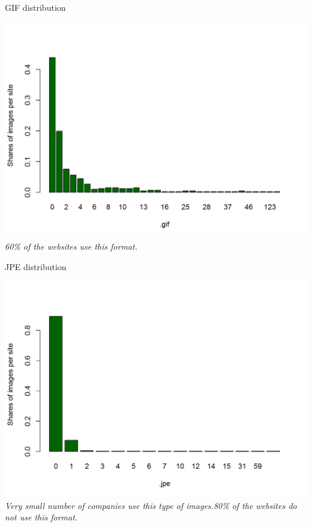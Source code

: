 \documentclass{book}
\begin{document}
\begin{table}[H]
\centering
\caption{GIF distribution}
\begin{center}
\includegraphics[scale=0.4]{../R/photos/56_gif_dist.png}    \\
\textit{60\% of the websites use this format.}
\end{center}
\end{table}
\begin{table}[H]
\centering
\caption{JPE distribution}
\begin{center}
\includegraphics[scale=0.4]{../R/photos/57_jpe_dist.png}    \\
\textit{Very small number of companies use this type of images.80\% of the websites do not use this format.}
\end{center}
\end{table}
\end{document}

